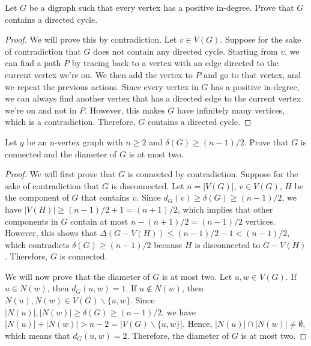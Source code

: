 \documentclass{article}
\newenvironment{problem}[2][Question]{\begin{trivlist}
\item[\hskip \labelsep {\bfseries #1}\hskip \labelsep {\bfseries #2.}]}{\end{trivlist}}
\begin{document}
\newpage

\begin{problem}{2}
    Let $G$ be a digraph such that every vertex has a positive in-degree. Prove that $G$ contains a directed cycle.
\end{problem}
\begin{proof}
    We will prove this by contradiction. Let $v \in V(G)$.  Suppose for the sake of contradiction that $G$ does not contain any directed cycle. Starting from $v$, we can find a path $P$ by tracing back to a vertex with an edge directed to the current vertex we're on. We then add the vertex to $P$ and go to that vertex, and we repeat the previous actions. Since every vertex in $G$ has a positive in-degree, we can always find another vertex that has a directed edge to the current vertex we're on and not in $P$. However, this makes $G$ have infinitely many vertices, which is a contradiction. Therefore, $G$ contains a directed cycle.
\end{proof}

\newpage

\begin{problem}{3}
 Let $g$ be an n-vertex graph with $n \geq 2$ and $\delta(G) \geq (n-1)/2$. Prove that $G$ is connected and the diameter of $G$ is at most two.
\end{problem}
\begin{proof}
    We will first prove that $G$ is connected by contradiction. Suppose for the sake of contradiction that $G$ is disconnected. Let $n = |V(G)|$, $v \in V(G)$, $H$ be the component of $G$ that contains $v$. Since $d_G(v) \geq \delta(G) \geq (n-1)/2$, we have $|V(H)| \geq (n-1)/2 + 1 = (n+1)/2$, which implies that other components in $G$ contain at most $n - (n+1)/2 = (n-1)/2$ vertices. However, this shows that $\Delta(G-V(H)) \leq (n-1)/2 - 1 < (n-1)/2$, which contradicts $\delta(G) \geq (n-1)/2$ because $H$ is disconnected to $G-V(H)$. Therefore, $G$ is connected.

    We will now prove that the diameter of $G$ is at most two. Let $u, w \in V(G)$. If $u \in N(w)$, then $d_G(u, w) = 1$. If $u \notin N(w)$, then $N(u), N(w) \in V(G) \backslash \{u, w\}$. Since $|N(u)|, |N(w)| \geq \delta(G) \geq (n-1)/2$, we have $|N(u)| + |N(w)| > n - 2 = |V(G) \backslash \{u, w\}|$. Hence, $|N(u)| \cap |N(w)| \neq \emptyset$, which means that $d_G(u, w) = 2$. Therefore, the diameter of $G$ is at most two.
\end{proof}

\newpage
\end{document}
